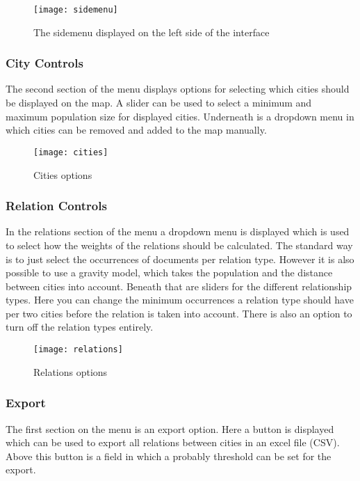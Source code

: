 \begin{figure}[H]
    \centering
    \texttt{[image: sidemenu]}
    \caption{The sidemenu displayed on the left side of the interface}
    \label{fig:sidemenu}
\end{figure}


\subsubsection{City Controls}
The second section of the menu displays options for selecting which cities should be displayed on the map. A slider can be used to select a minimum and maximum population size for displayed cities. Underneath is a dropdown menu in which cities can be removed and added to the map manually. 

\begin{figure}[H]
    \centering
    \texttt{[image: cities]}
    \caption{Cities options}
    \label{fig:infoflow}
\end{figure}

\subsubsection{Relation Controls}
In the relations section of the menu a dropdown menu is displayed which is used to select how the weights of the relations should be calculated. The standard way is to just select the occurrences of documents per relation type. However it is also possible to use a gravity model, which takes the population and the distance between cities into account.  Beneath that are sliders for the different relationship types. Here you can change the minimum occurrences a relation type should have per two cities before the relation is taken into account. There is also an option to turn off the relation types entirely.

\begin{figure}[H]
    \centering
    \texttt{[image: relations]}
    \caption{Relations options}
    \label{fig:infoflow}
\end{figure}

\subsubsection{Export}
The first section on the menu is an export option. Here a button is displayed which can be used to export all relations between cities in an excel file (CSV). Above this button is a field in which a probably threshold can be set for the export. 


